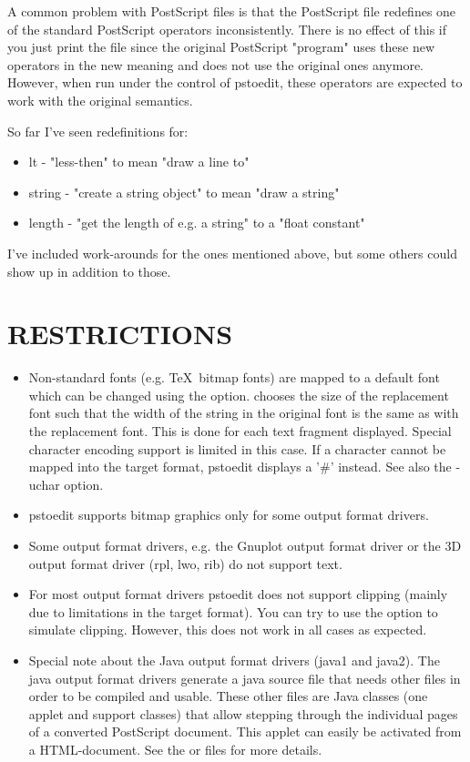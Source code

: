 \documentclass[english,a4paper]{article}
\begin{document}
A common problem with PostScript files is that the PostScript file redefines
one of the standard PostScript operators inconsistently. There is no effect
of this if you just print the file since the original PostScript "program"
uses these new operators in the new meaning and does not use the original
ones anymore. However, when run under the control of pstoedit, these
operators are expected to work with the original semantics.

So far I've seen redefinitions for:

\begin{itemize}
   \item lt - "less-then" to mean "draw a line to"
   \item string - "create a string object" to mean "draw a string"
   \item length - "get the length of e.g. a string" to a "float constant"
\end{itemize}

I've included work-arounds for the ones mentioned above, but some others
could show up in addition to those.


\section{RESTRICTIONS}

\begin{itemize}
\item Non-standard fonts (e.g. \TeX\ bitmap fonts) are mapped to a default font which
can be changed using the  option.  chooses the size of
the replacement font such that the width of the string in the original font is
the same as with the replacement font. This is done for each text fragment
displayed. Special character encoding support is limited in this case. If a
character cannot be mapped into the target format, pstoedit displays a '\#'
instead. See also the -uchar option.
\item pstoedit supports bitmap graphics only for some output format drivers.
\item Some output format drivers, e.g. the Gnuplot output format driver or the 3D output format driver (rpl, lwo, rib) do not support text.
\item For most output format drivers pstoedit does not support clipping (mainly due to limitations in the target format). You can try to use the
 option to simulate clipping. However, this does not work in all cases as expected.
\item Special note about the Java output format drivers (java1 and java2).
The java output format drivers generate a java source file that needs other files in
order to be compiled and usable. These other files are Java classes (one
applet and support classes) that allow stepping through the individual pages
of a converted PostScript document. This applet can easily be activated from
a HTML-document. See the  or
 files for more details.
\end{itemize}
\end{document}
